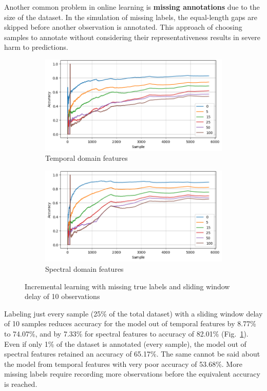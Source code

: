Another common problem in online learning is \textbf{missing annotations} due to the size of the dataset. In the simulation of missing labels, the equal-length gaps are skipped before another observation is annotated. This approach of choosing samples to annotate without considering their representativeness results in severe harm to predictions. 

\begin{figure}[ht]
    \centering
    \begin{subfigure}[b]{0.49\textwidth}
        \includegraphics[width=\textwidth]{assets/design/gradual-learning-skip-temporal-domain-fault.png}
        \caption{Temporal domain features}
    \end{subfigure}
    \hfill
    \begin{subfigure}[b]{0.49\textwidth}
        \includegraphics[width=\textwidth]{assets/design/gradual-learning-skip-spectral-domain-fault.png}
        \caption{Spectral domain features}
    \end{subfigure}
    \caption{Incremental learning with missing true labels and sliding window delay of 10 observations}
    \label{fig:design:online-label-skip}
\end{figure}
 
Labeling just every  sample (25\% of the total dataset) with a sliding window delay of 10 samples reduces accuracy for the model out of temporal features by 8.77\% to 74.07\%, and by 7.33\% for spectral features to accuracy of 82.01\% (Fig.~\ref{fig:design:online-label-skip}). Even if only 1\% of the dataset is annotated (every  sample), the model out of spectral features retained an accuracy of 65.17\%. The same cannot be said about the model from temporal features with very poor accuracy of 53.68\%. More missing labels require recording more observations before the equivalent accuracy is reached.